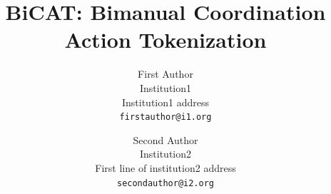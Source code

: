 \documentclass[10pt,twocolumn,letterpaper]{article}
\title{BiCAT: Bimanual Coordination Action Tokenization}
\author{First Author\\
Institution1\\
Institution1 address\\
{\tt\small firstauthor@i1.org}
\and
Second Author\\
Institution2\\
First line of institution2 address\\
{\tt\small secondauthor@i2.org}
}
\begin{document}

    






% 
% 
% 
{
    \small
    
    
}

\appendix

\end{document}
